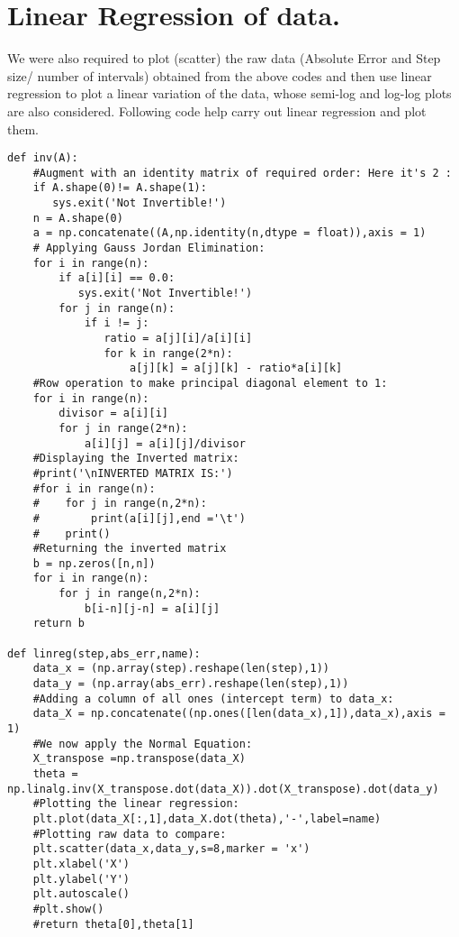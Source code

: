 \documentclass[a4paper, 12pt]{report}
\begin{document}
\section{Linear Regression of data.}
We were also required to plot (scatter) the raw data (Absolute Error and Step size/ number of intervals) obtained from the above codes and then use linear regression to plot a linear variation of the data, whose semi-log and log-log plots are also considered. Following code help carry out linear regression and plot them.
\begin{lstlisting}
def inv(A):
    #Augment with an identity matrix of required order: Here it's 2 :
    if A.shape(0)!= A.shape(1):
       sys.exit('Not Invertible!')
    n = A.shape(0)
    a = np.concatenate((A,np.identity(n,dtype = float)),axis = 1)
    # Applying Gauss Jordan Elimination:
    for i in range(n):
        if a[i][i] == 0.0:
           sys.exit('Not Invertible!') 
        for j in range(n):
            if i != j:
               ratio = a[j][i]/a[i][i]
               for k in range(2*n):
                   a[j][k] = a[j][k] - ratio*a[i][k]
    #Row operation to make principal diagonal element to 1:
    for i in range(n):
        divisor = a[i][i]
        for j in range(2*n):
            a[i][j] = a[i][j]/divisor
    #Displaying the Inverted matrix:
    #print('\nINVERTED MATRIX IS:')
    #for i in range(n):
    #    for j in range(n,2*n):
    #        print(a[i][j],end ='\t')
    #    print()
    #Returning the inverted matrix
    b = np.zeros([n,n])
    for i in range(n):
        for j in range(n,2*n):
            b[i-n][j-n] = a[i][j]
    return b

def linreg(step,abs_err,name):
    data_x = (np.array(step).reshape(len(step),1))
    data_y = (np.array(abs_err).reshape(len(step),1))
    #Adding a column of all ones (intercept term) to data_x:
    data_X = np.concatenate((np.ones([len(data_x),1]),data_x),axis = 1)
    #We now apply the Normal Equation:
    X_transpose =np.transpose(data_X)
    theta = np.linalg.inv(X_transpose.dot(data_X)).dot(X_transpose).dot(data_y)
    #Plotting the linear regression:
    plt.plot(data_X[:,1],data_X.dot(theta),'-',label=name)
    #Plotting raw data to compare:
    plt.scatter(data_x,data_y,s=8,marker = 'x')
    plt.xlabel('X')
    plt.ylabel('Y')
    plt.autoscale()
    #plt.show()
    #return theta[0],theta[1]
\end{lstlisting}
\end{document}

